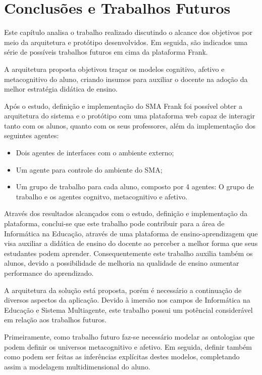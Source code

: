 \chapter{Conclusões e Trabalhos Futuros}
Este capítulo analisa o trabalho realizado discutindo o alcance dos objetivos por meio da arquitetura e protótipo desenvolvidos. Em seguida, são indicados uma série de possíveis trabalhos futuros em cima da plataforma Frank.

A arquitetura proposta objetivou traçar os modelos cognitivo, afetivo e metacognitivo do aluno, criando insumos para auxiliar o docente na adoção da melhor estratégia didática de ensino.

Após o estudo, definição e implementação do SMA Frank foi possível obter a arquitetura do sistema e o protótipo com uma plataforma web capaz de interagir tanto com os alunos, quanto com os seus professores, além da implementação dos seguintes agentes:
\begin{itemize}
 	\item Dois agentes de interfaces com o ambiente externo;
	\item Um agente para controle do ambiente do SMA;
	\item Um grupo de trabalho para cada aluno, composto por 4 agentes: O grupo de trabalho e os agentes cognitvo, metacognitivo e afetivo.
\end{itemize}

Através dos resultados alcançados com o estudo, definição e implementação da plataforma, conclui-se que este trabalho pode contribuir para a área de Informática na Educação, através de uma plataforma de ensino-aprendizagem que visa auxiliar a didática de ensino do docente ao perceber a melhor forma que seus estudantes podem aprender. Consequentemente este trabalho auxilia também os alunos, devido a possibilidade de melhoria na qualidade de ensino aumentar performance do aprendizado. 

A arquitetura da solução está proposta, porém é necessário a continuação de diversos aspectos da aplicação. Devido à imersão nos campos de Informática na Educação e Sistema Multiagente, este trabalho possui um potêncial considerável em relação aos trabalhos futuros.

Primeiramente, como trabalho futuro faz-se necessário modelar as ontologias que podem definir os universos metacognitivo e afetivo. Em seguida, definir também como podem ser feitas as inferências explícitas destes modelos, completando assim a modelagem multidimensional do aluno.

